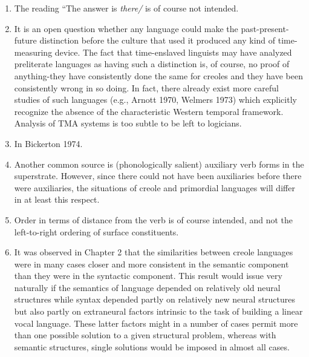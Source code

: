 \begin{enumerate}
\item The reading ``The answer is \textit{ther}\textit{e}\textit{/{\textquotedbl}} is of course not intended.
\item It is an open question whether any language could make the past-present-future distinction before the culture that used it produced any kind of time-measuring device. The fact that time-enslaved linguists may have analyzed preliterate languages as having such a distinction is, of course, no proof of anything-they have consistently done the same for creoles and they have been consistently wrong in so doing. In fact, there already exist more careful studies of such languages (e.g., Arnott 1970, Welmers 1973) which explicitly recognize the absence of the characteristic Western temporal framework. Analysis of TMA systems is too subtle to be left to logicians. 
\item In Bickerton 1974.
\item Another common source is (phonologically salient) auxiliary verb forms in the superstrate. However, since there could not have been auxiliaries before there were auxiliaries, the situations of creole and primordial languages will differ in at least this respect.
\item Order in terms of distance from the verb is of course intended, 
and not the left-to-right ordering of surface constituents. 
\item It was observed in Chapter 2 that the similarities between creole languages were in many cases closer and more consistent in the semantic component than they were in the syntactic component. This result would issue very naturally if the semantics of language depended on relatively old neural structnres while syntax depended partly on relatively new neural structures but also partly on extraneural factors intrinsic to the task of building a linear vocal language. These latter factors might in a number of cases permit more than one possible solution to a given structural problem, whereas with semantic struc\-tures, single solutions would be imposed in almost all cases.
\end{enumerate}

